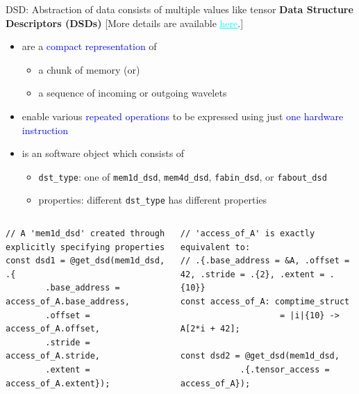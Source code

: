 \documentclass[dvipdfmx, 11pt, aspectratio=169]{beamer}   %
\newcommand{\ulhref}[2]{\href{#1}{\textcolor{cyan}{\uline{#2}}}}
\begin{document}
\begin{frame}[fragile]{DSD: Abstraction of data consists of multiple values like tensor}
\textbf{Data Structure Descriptors (DSDs)}      [More details are available \ulhref{https://sdk.cerebras.net/csl/language/dsds\#data-structure-descriptors}{here}.]
\begin{itemize}
    \item are a \textcolor{blue}{compact representation} of 
    \begin{itemize}
        \item a chunk of memory (or)
        \item a sequence of incoming or outgoing wavelets
    \end{itemize}
    \item enable various \textcolor{blue}{repeated operations} to be expressed using just \textcolor{blue}{one hardware instruction}
    \item is an software object which consists of
    \begin{itemize}
        \item \lstinline|dst_type|: one of \lstinline|mem1d_dsd|, \lstinline|mem4d_dsd|, \lstinline|fabin_dsd|, or \lstinline|fabout_dsd|
        \item properties: different \lstinline|dst_type| has different properties
    \end{itemize}
\end{itemize}
\begin{columns}
\begin{lstlisting}[language=CSL, basicstyle=\ttfamily\tiny]
// A 'mem1d_dsd' created through explicitly specifying properties
const dsd1 = @get_dsd(mem1d_dsd, .{
        .base_address = access_of_A.base_address,
        .offset = access_of_A.offset,
        .stride = access_of_A.stride,
        .extent = access_of_A.extent});
\end{lstlisting}
\begin{lstlisting}[language=CSL, basicstyle=\ttfamily\tiny]
// 'access_of_A' is exactly equivalent to: 
// .{.base_address = &A, .offset = 42, .stride = .{2}, .extent = .{10}}
const access_of_A: comptime_struct 
                    = |i|{10} -> A[2*i + 42];

const dsd2 = @get_dsd(mem1d_dsd, 
            .{.tensor_access = access_of_A});
\end{lstlisting}
\end{columns}
\end{frame}
\end{document}
